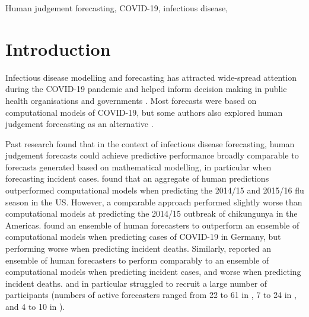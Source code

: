 \documentclass[10pt,a4paper,twocolumn]{article}
\begin{document}
Human judgement forecasting, COVID-19, infectious disease, 



\clearpage

\section*{Introduction}

Infectious disease modelling and forecasting has attracted wide-spread attention during the COVID-19 pandemic and helped inform decision making in public health organisations and governments \cite{cramerEvaluationIndividualEnsemble2021, venkatramananUtilityHumanJudgment2022}. 
Most forecasts were based on computational models of COVID-19, but some authors also explored human judgement forecasting as an alternative \cite{recchiaHowWellDid2021, mcandrewExpertJudgmentModel2022, bosseComparingHumanModelbased2022, mcandrewChimericForecastingCombining2022}. 

Past research found that in the context of infectious disease forecasting, human judgement forecasts could achieve predictive performance broadly comparable to forecasts generated based on mathematical modelling, in particular when forecasting incident cases. \citet{farrowHumanJudgmentApproach2017} found that an aggregate of human predictions outperformed computational models when predicting the 2014/15 and 2015/16 flu season in the US. However, a comparable approach performed slightly worse than computational models at predicting the 2014/15 outbreak of chikungunya in the Americas. 
\citet{bosseComparingHumanModelbased2022} found an ensemble of human forecasters to outperform an ensemble of computational models when predicting cases of COVID-19 in Germany, but performing worse when predicting incident deaths. Similarly, \citet{mcandrewChimericForecastingCombining2022} reported an ensemble of human forecasters to perform comparably to an ensemble of computational models when predicting incident cases, and worse when predicting incident deaths. \citet{farrowHumanJudgmentApproach2017} and in particular \citet{bosseComparingHumanModelbased2022} struggled to recruit a large number of participants (numbers of active forecasters ranged from 22 to 61 in \citet{mcandrewChimericForecastingCombining2022}, 7 to 24 in \citet{farrowHumanJudgmentApproach2017}, and 4 to 10 in \citet{bosseComparingHumanModelbased2022}). 
\end{document}
